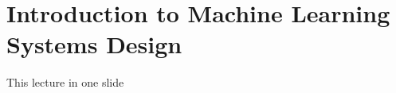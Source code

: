






\section[Systems Design]{Introduction to Machine Learning Systems Design}



\begin{frame}{This lecture in one slide}
  \begin{sidebody}
  \end{sidebody}
\end{frame}

